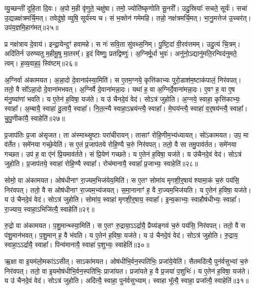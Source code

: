 व्यु॒च्छन्ती॑ दुहि॒ता दि॒वः।
अ॒पो म॒ही वृ॑णुते॒ चक्षु॑षा।
तमो॒ ज्योति॑ष्कृणोति सू॒नरी᳚।
उदु॒स्रियाः᳚ सचते॒ सूर्यः॑।
सचा॑ उ॒द्यन्नक्ष॑त्रमर्चि॒मत्।
तवेदु॑षो॒ व्युषि॒ सूर्य॑स्य च।
सं भ॒क्तेन॑ गमेमहि।
तन्नो॒ नक्ष॑त्रमर्चि॒मत्।
भा॒नु॒मत्तेज॑ उ॒च्चर॑त्।
उप॑य॒ज्ञमि॒हाग॑मत्॥२५॥

प्र नक्ष॑त्राय दे॒वाय॑।
इन्द्रा॒येन्दुꣳ॑ हवामहे।
स नः॑ सवि॒ता सु॑वथ्स॒निम्।
पु॒ष्टि॒दां वी॒रव॑त्तमम्।
उदु॒त्यं चि॒त्रम्।
अदि॑तिर्न उरुष्यतु म॒हीमू॒षु मा॒तरम्᳚।
इ॒दं विष्णुः॒ प्रतद्विष्णुः॑।
अ॒ग्निर्मू॒र्धा भुवः॑।
अनु॑नो॒\-ऽद्यानु॑मति॒रन्विद॑नुमते॒ त्वम्।
ह॒व्य॒वाह॒ꣴ॒ स्वि॑ष्टम्॥२६॥\anuvakamend[आ॒य॒त्य॑गम॒थ्स्वि॑ष्टम्]

अ॒ग्निर्वा अ॑कामयत।
अ॒न्ना॒दो दे॒वानाꣴ॑स्या॒मिति॑।
स ए॒तम॒ग्नये॒ कृत्ति॑काभ्यः पुरो॒डाश॑म॒ष्टा\-क॑पालं॒ निर॑वपत्।
ततो॒ वै सो᳚\-ऽन्ना॒दो दे॒वाना॑मभवत्।
अ॒ग्निर्वै दे॒वाना॑मन्ना॒दः।
यथा॑ ह॒ वा अ॒ग्निर्दे॒वाना॑मन्ना॒दः।
ए॒वꣳ ह॒ वा ए॒ष म॑नु॒ष्या॑णां भवति।
य ए॒तेन॑ ह॒विषा॒ यज॑ते।
य उ॑ चैनदे॒वं वेद॑।
सोऽत्र॑ जुहोति।
अ॒ग्नये॒ स्वाहा॒ कृत्ति॑काभ्यः॒ स्वाहा᳚।
अ॒म्बायै॒ स्वाहा॑ दु॒लायै॒ स्वाहा᳚।
नि॒त॒त्न्यै स्वाहा॒\-ऽभ्रय॑न्त्यै॒ स्वाहा᳚।
मे॒घय॑न्त्यै॒ स्वाहा॑ व॒र्॒षय॑न्त्यै॒ स्वाहा᳚।
चु॒पु॒णीका॑यै॒ स्वाहेति॑॥२७॥

प्र॒जा\-प॑तिः प्र॒जा अ॑\-सृजत।
ता अ॑स्माथ्सृ॒ष्टाः परा॑चीरायन्।
तासाꣳ॑ रोहि॒णीम॒भ्य॑ध्यायत्।
सो॑ऽकामयत।
उप॒ मा व॑र्तेत।
समे॑नया गच्छे॒येति॑।
स ए॒तं प्र॒जा\-प॑तये रोहि॒ण्यै च॒रुं निर॑वपत्।
ततो॒ वै सा तमु॒पाव॑र्तत।
समे॑नया गच्छत।
उप॑ ह॒ वा ए॑नं प्रि॒यमाव॑र्तते।
सं प्रि॒येण॑ गच्छते।
य ए॒तेन॑ ह॒विषा॒ यज॑ते।
य उ॑चैनदे॒वं वेद॑।
सोऽत्र॑ जुहोति।
प्र॒जा\-प॑तये॒ स्वाहा॑ रोहि॒ण्यै स्वाहा᳚।
रोच॑मानायै॒ स्वाहा᳚ प्र॒जाभ्यः॒ स्वाहेति॑॥२८॥

सोमो॒ वा अ॑कामयत।
ओष॑धीनाꣳ रा॒ज्यम॒भिज॑येय॒मिति॑।
स ए॒तꣳ सोमा॑य मृगशी॒र्॒षाय॑ श्यामा॒कं च॒रुं पय॑सि॒ निर॑वपत्।
ततो॒ वै स ओष॑धीनाꣳ रा॒ज्यम॒भ्य॑जयत्।
स॒मा॒नानाꣳ॑ ह॒ वै रा॒ज्यम॒भिज॑यति।
य ए॒तेन॑ ह॒विषा॒ यज॑ते।
य उ॑ चैनदे॒वं वेद॑।
सोऽत्र॑ जुहोति।
सोमा॑य॒ स्वाहा॑ मृगशी॒र्‌॒\mbox{}षाय॒ स्वाहा᳚।
इ॒न्व॒काभ्यः॒ स्वाहौष॑धीभ्यः॒ स्वाहा᳚।
रा॒ज्याय॒ स्वाहा॒\-ऽभिजि॑त्यै॒ स्वाहेति॑॥२९॥

रु॒द्रो वा अ॑कामयत।
प॒शु॒मान्थ्स्या॒मिति॑।
स ए॒तꣳ रु॒द्राया॒ऽऽर्द्रायै॒ प्रैय्य॑ङ्गवं च॒रुं पय॑सि॒ निर॑वपत्।
ततो॒ वै स प॑शु॒मान॑भवत्।
प॒शु॒मान् ह॒ वै भ॑वति।
य ए॒तेन॑ ह॒विषा॒ यज॑ते।
य उ॑ चैनदे॒वं वेद॑।
सोऽत्र॑ जुहोति।
रु॒द्राय॒ स्वाहा॒\-ऽऽर्द्रायै॒ स्वाहा᳚।
पिन्व॑मानायै॒ स्वाहा॑ प॒शुभ्यः॒ स्वाहेति॑॥३०॥

ऋ॒क्षा वा इ॒यम॑लो॒मका॑\-ऽऽसीत्।
साऽका॑मयत।
ओष॑धीभि॒र्वन॒\-स्पति॑भिः॒ प्रजा॑ये॒येति॑।
सैतमदि॑त्यै॒ पुन॑र्वसुभ्यां च॒रुं निर॑वपत्।
ततो॒ वा इ॒यमोष॑धीभि॒र्वन॒स्पति॑भिः॒ प्राजा॑यत।
प्रजा॑यते ह॒ वै प्र॒जया॑ प॒शुभिः॑।
य ए॒तेन॑ ह॒विषा॒ यज॑ते।
य उ॑ चैनदे॒वं वेद॑।
सोऽत्र॑ जुहोति।
अदि॑त्यै॒ स्वाहा॒ पुन॑र्वसुभ्याम्।
स्वाहा भू᳚त्यै॒ स्वाहा॒ प्रजा᳚त्यै॒ स्वाहेति॑॥३१॥

